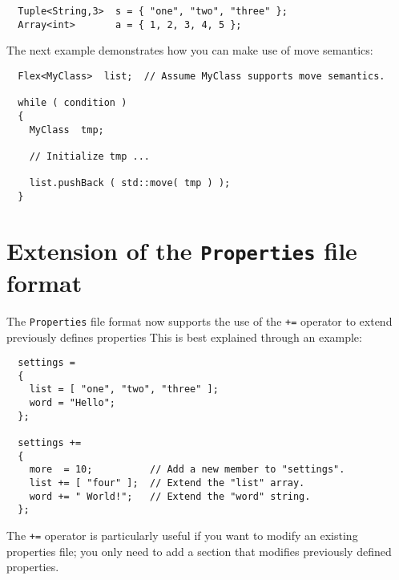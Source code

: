 \documentclass[a4paper]{article}
\newcommand{\Code}[1]{\texttt{#1}}
\begin{document}
\begin{lstlisting}
  Tuple<String,3>  s = { "one", "two", "three" };
  Array<int>       a = { 1, 2, 3, 4, 5 };
\end{lstlisting}

The next example demonstrates how you can make use of move semantics:

\begin{lstlisting}
  Flex<MyClass>  list;  // Assume MyClass supports move semantics.

  while ( condition )
  {
    MyClass  tmp;

    // Initialize tmp ...

    list.pushBack ( std::move( tmp ) );
  }
\end{lstlisting}


\section{Extension of the \Code{Properties} file format}

The \Code{Properties} file format now supports the use of the \Code{+=}
operator to extend previously defines properties This is best explained
through an example:

\begin{lstlisting}
  settings =
  {
    list = [ "one", "two", "three" ];
    word = "Hello";
  };

  settings +=
  {
    more  = 10;          // Add a new member to "settings".
    list += [ "four" ];  // Extend the "list" array.
    word += " World!";   // Extend the "word" string.
  };
\end{lstlisting}

The \Code{+=} operator is particularly useful if you want to modify an
existing properties file; you only need to add a section that modifies
previously defined properties.
\end{document}
